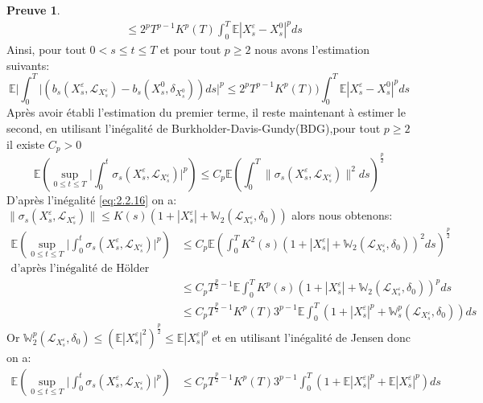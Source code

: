 \documentclass[12pt,a4paper,twoside,fleqn]{book}%
\theoremstyle{definition}
\newtheorem*{pr}{\textbf{Preuve}}
\theoremstyle{lemme}
\numberwithin{equation}{section}
\begin{document}
\begin{pr}
\[\begin{aligned}
&\leq2^pT^{p-1}K^p(T)\int_{0}^{T}\mathbb{E}|X_s^\varepsilon-X_s^0|^pds
\end{aligned}
\]
Ainsi, pour tout $0< s\leq t\leq T$ et pour tout $p\geq2$ nous avons l'estimation suivants:
\begin{equation}\label{eq:2.2.26}
	\mathbb{E}\Big|\int_{0}^{T}\Big|\left(b_s(X_s^\varepsilon,\mathcal{L}_{X_s^\varepsilon}) - b_s(X_s^0,\delta_{X_s^0})\right)ds\Big|^p\leq 2^pT^{p-1}K^p(T))\int_{0}^{T}\mathbb{E}|X_s^\varepsilon-X_s^0|^pds
\end{equation}
Après avoir établi l'estimation du premier terme, il reste maintenant à estimer le second, en utilisant l'inégalité de Burkholder-Davis-Gundy(BDG),pour tout $p\geq2$ il existe $C_p>0$
\[
\mathbb{E}\left(\sup_{0\leq t \leq T}\Big|\int_{0}^{t}\sigma_s(X_s^\varepsilon,\mathcal{L}_{X_s^\varepsilon})\Big|^p\right)\leq C_p\mathbb{E}\left(\int_{0}^{T}\|\sigma_s(X_s^\varepsilon,\mathcal{L}_{X_s^\varepsilon})\|^2ds\right)^{\frac{p}{2}}
\]
D'après l'inégalité \ref{eq:2.2.16} on a: $\|\sigma_s(X_s^\varepsilon,\mathcal{L}_{X_s^\varepsilon})\|\leq K(s)\left(1 + |X_s^\varepsilon| + \mathbb{W}_2(\mathcal{L}_{X_s^\varepsilon},\delta_0)\right)$
alors nous obtenons:
\[
\begin{aligned}
\mathbb{E}\left(\sup_{0\leq t \leq T}\Big|\int_{0}^{t}\sigma_s(X_s^\varepsilon,\mathcal{L}_{X_s^\varepsilon})\Big|^p\right)&\leq C_p\mathbb{E}\left(\int_{0}^{T}K^2(s)\left( 1+|X_s^\varepsilon| + \mathbb{W}_2(\mathcal{L}_{X_s^\varepsilon},\delta_0) \right)^2ds\right)^{\frac{p}{2}}\\
\text{d'après l'inégalité de Hölder}\\
&\leq C_p T^{\frac{p}{2}-1} \mathbb{E}\int_{0}^{T}K^p(s)\left(1+|X_s^\varepsilon| + \mathbb{W}_2(\mathcal{L}_{X_s^\varepsilon},\delta_0)\right)^pds\\
&\leq C_pT^{\frac{p}{2}-1}K^p(T)3^{p-1}\mathbb{E}\int_{0}^{T}\left(1 + |X_s^\varepsilon|^p + \mathbb{W}_s^p(\mathcal{L}_{X_s^\varepsilon},\delta_0)\right)ds
\end{aligned}
\]
Or $\mathbb{W}_2^p(\mathcal{L}_{X_s^\varepsilon},\delta_{0})\leq \left(\mathbb{E}|X_s^\varepsilon|^2\right)^{\frac{p}{2}}\leq\mathbb{E}|X_s^\varepsilon|^p$ et en utilisant l'inégalité de Jensen donc on a:
\[
\begin{aligned}	
\mathbb{E}\left(\sup_{0\leq t \leq T}\Big|\int_{0}^{t}\sigma_s(X_s^\varepsilon,\mathcal{L}_{X_s^\varepsilon})\Big|^p\right)&\leq  C_pT^{\frac{p}{2}-1}K^p(T)3^{p-1}\int_{0}^{T}\left(1 + \mathbb{E}|X_s^\varepsilon|^p + \mathbb{E}|X_s^\varepsilon|^p\right)ds\\

\end{aligned}\]
\end{pr}
\end{document}
